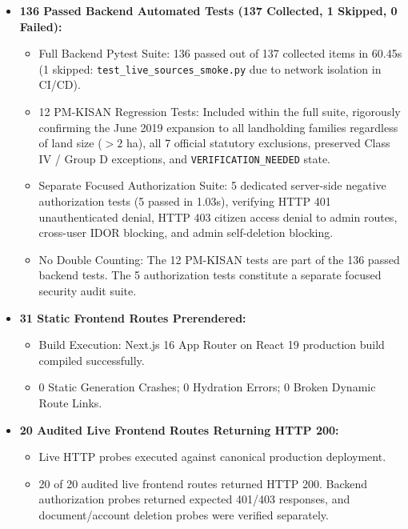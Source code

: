 \begin{itemize}
    \item \textbf{136 Passed Backend Automated Tests (137 Collected, 1 Skipped, 0 Failed):}
    \begin{itemize}
        \item Full Backend Pytest Suite: 136 passed out of 137 collected items in 60.45s (1 skipped: \texttt{test\_live\_sources\_smoke.py} due to network isolation in CI/CD).
        \item 12 PM-KISAN Regression Tests: Included within the full suite, rigorously confirming the June 2019 expansion to all landholding families regardless of land size ($>2$ ha), all 7 official statutory exclusions, preserved Class IV / Group D exceptions, and \texttt{VERIFICATION\_NEEDED} state.
        \item Separate Focused Authorization Suite: 5 dedicated server-side negative authorization tests (5 passed in 1.03s), verifying HTTP 401 unauthenticated denial, HTTP 403 citizen access denial to admin routes, cross-user IDOR blocking, and admin self-deletion blocking.
        \item No Double Counting: The 12 PM-KISAN tests are part of the 136 passed backend tests. The 5 authorization tests constitute a separate focused security audit suite.
    \end{itemize}

    \item \textbf{31 Static Frontend Routes Prerendered:}
    \begin{itemize}
        \item Build Execution: Next.js 16 App Router on React 19 production build compiled successfully.
        \item 0 Static Generation Crashes; 0 Hydration Errors; 0 Broken Dynamic Route Links.
    \end{itemize}

    \item \textbf{20 Audited Live Frontend Routes Returning HTTP 200:}
    \begin{itemize}
        \item Live HTTP probes executed against canonical production deployment.
        \item 20 of 20 audited live frontend routes returned HTTP 200. Backend authorization probes returned expected 401/403 responses, and document/account deletion probes were verified separately.
    \end{itemize}


\end{itemize}
